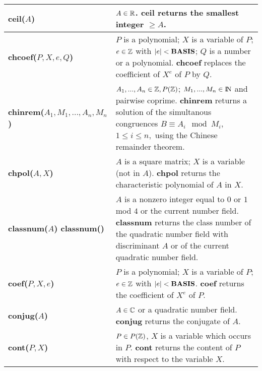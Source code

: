 {\begin{tabular}{|p{1.95in}|p{3.83in}|}
{\bf ceil($A$)} &
$A \in \mbox{$\mathbb R$}$.\newline
{\bf ceil} returns the smallest integer $\geq A$.\\ \hline

{\bf chcoef($P,X,e,Q$)} &
$P$ is a polynomial; $X$ is a variable of $P$; $e \in \mbox{$\mathbb Z$}$ \newline
with $|e| < {\rm {\bf BASIS}}$; $Q$ is a number or a polynomial.\newline
{\bf chcoef} replaces the coefficient of $X^e$ of $P$ by $Q$.\\ \hline

{\bf chinrem($A_1,M_1, ... , A_n,M_n$)} &
$A_1,...,A_n \in \mbox{$\mathbb Z$}, P(\mbox{$\mathbb Z$})$; $M_1,...,M_n \in {\rm{I\!N}}$ and pairwise coprime.\newline
{\bf chinrem} returns a solution of the simultanous con\-gru\-ences
$B \equiv A_i \mod M_i$, $1 \leq i \leq n,$ using the Chinese remainder theorem.\\ \hline

{\bf chpol($A,X$)} &
$A$ is a square matrix; $X$ is a variable (not in $A$).\newline
{\bf chpol} returns the characteristic polynomial of $A$ in $X$. \\ \hline

{\bf classnum($A$) \newline
classnum()} &
$A$ is a nonzero integer equal to $0$ or $1$ mod $4$ or the current number
field. \newline
{\bf classnum} returns the class number of the quadratic number field with
discriminant $A$ or of the current qua\-dra\-tic number field. \\ \hline

{\bf coef($P,X,e$)} &
$P$ is a polynomial; $X$ is a variable of $P$;\newline
$e \in \mbox{$\mathbb Z$}$ with $|e| < {\rm {\bf BASIS}}$.\newline
{\bf coef} returns the coefficient of $X^e$ of $P$.\\ \hline

{\bf conjug($A$)} &
$A \in \mbox{$\mathbb C$}$ or a quadratic number field.\newline
{\bf conjug} returns the conjugate of $A$.\\ \hline

{\bf cont($P,X$)} &
$P \in P(\mbox{$\mathbb Z$})$, $X$ is a variable which occurs in $P$.\newline
{\bf cont} returns the content of $P$ with respect to the variable $X$.\\ \hline
\end{tabular}

}

